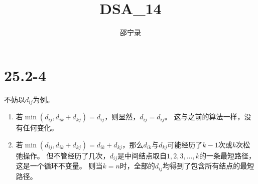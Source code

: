 \documentclass[UTF8]{ctexart}
\title{DSA\_14}
\author{邵宁录\space\space\space\space2018202195}
\begin{document}
    \maketitle
    \tableofcontents
    \clearpage
    \section{25.2-4}
    不妨以$d_{ij}$为例。

    \begin{enumerate}
      \item 若$\min(d_{ij}, d_{ik}+d_{kj})=d_{ij}$，则显然，$d_{ij}=d_{ij}$。
      这与之前的算法一样，没有任何变化。
      \item 若$\min(d_{ij}, d_{ik}+d_{kj})=d_{ik}+d_{kj}$，那么$d_{ik}$与$d_{kj}$可能经历了$k-1$次或$k$次松弛操作。
      但不管经历了几次，$d_{ij}$是中间结点取自${1,2,3,\ldots,k}$的一条最短路径，这是一个循环不变量。
      则当$k=n$时，全部的$d_{ij}$均得到了包含所有结点的最短路径。
    \end{enumerate}
\end{document}

